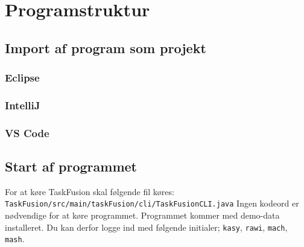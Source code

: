 \section{Programstruktur}\label{sec:struct}
\subsection{Import af program som projekt}
\subsubsection{Eclipse}
\subsubsection{IntelliJ}
\subsubsection{VS Code}

\subsection{Start af programmet}
For at køre TaskFusion skal følgende fil køres: \texttt{TaskFusion/src/main/taskFusion/cli/TaskFusionCLI.java}
Ingen kodeord er nødvendige for at køre programmet.
Programmet kommer med demo-data installeret. Du kan derfor logge ind med følgende initialer; \texttt{kasy}, \texttt{rawi}, \texttt{mach}, \texttt{mash}.

